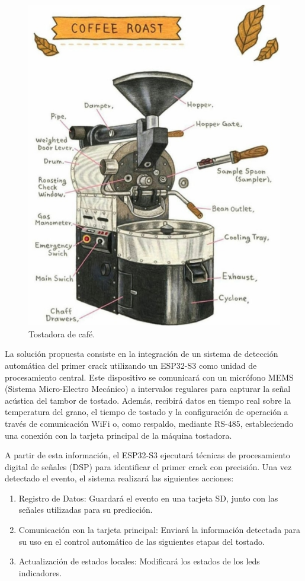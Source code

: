 \documentclass[
11pt, %
]{charter}
\begin{document}
\begin{figure}[htpb]
\centering 
\includegraphics[width=.45\textwidth]{./Figuras/tostadora.png}
\caption{Tostadora de café.}
\label{fig:Tostadora}
\end{figure}

La solución propuesta consiste en la integración de un sistema de detección automática del primer crack utilizando un ESP32-S3 como unidad de procesamiento central. Este dispositivo se comunicará con un micrófono MEMS (Sistema Micro-Electro Mecánico) a intervalos regulares para capturar la señal acústica del tambor de tostado. Además, recibirá datos en tiempo real sobre la temperatura del grano, el tiempo de tostado y la configuración de operación a través de comunicación WiFi o, como respaldo, mediante RS-485, estableciendo una conexión con la tarjeta principal de la máquina tostadora.

A partir de esta información, el ESP32-S3 ejecutará técnicas de procesamiento digital de señales (DSP) para identificar el primer crack con precisión. Una vez detectado el evento, el sistema realizará las siguientes acciones:

\begin{enumerate}
	\item Registro de Datos: Guardará el evento en una tarjeta SD, junto con las señales 			utilizadas para su predicción.
	
	\item Comunicación con la tarjeta principal: Enviará la información detectada para su 			uso en el control automático de las siguientes etapas del tostado.
	
	\item Actualización de estados locales: Modificará los estados de los leds indicadores.
	
\end{enumerate}
\end{document}
